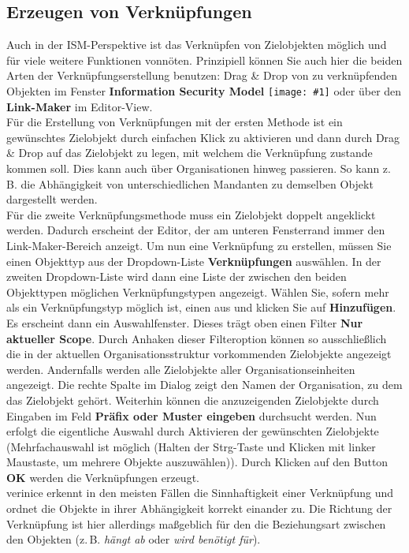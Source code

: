 \documentclass[a4paper,10pt]{book}
\newcommand{\icon}[1]{\texttt{[image: \#1]}}
\begin{document}
\subsection{Erzeugen von Verknüpfungen}
\label{sec:ismView_dd}
Auch in der ISM-Perspektive ist das Verknüpfen von Zielobjekten
möglich und für viele weitere Funktionen vonnöten.  Prinzipiell können
Sie auch hier die beiden Arten der Verknüpfungserstellung benutzen:
Drag \& Drop von zu verknüpfenden Objekten im Fenster
\textbf{Information Security
  Model} \icon{Icon/Informationssicherheitsmodell.png}
oder über den \textbf{Link-Maker} im Editor-View.
\newline\\
Für die Erstellung von Verknüpfungen mit der ersten Methode ist ein
gewünschtes Zielobjekt durch einfachen Klick zu aktivieren und dann
durch Drag \& Drop auf das Zielobjekt zu legen, mit welchem die
Verknüpfung zustande kommen soll. Dies kann auch über Organisationen
hinweg passieren.  So kann z.\,B. die Abhängigkeit von
unterschiedlichen Mandanten zu demselben Objekt dargestellt werden.
\newline\\
Für die zweite Verknüpfungsmethode muss ein Zielobjekt doppelt
angeklickt werden.  Dadurch erscheint der Editor, der am unteren
Fensterrand immer den Link-Maker-Bereich anzeigt.  Um nun eine
Verknüpfung zu erstellen, müssen Sie einen Objekttyp aus der
Dropdown-Liste \textbf{Verknüpfungen} auswählen.  In der zweiten
Dropdown-Liste wird dann eine Liste der zwischen den beiden
Objekttypen möglichen Verknüpfungstypen angezeigt.  Wählen Sie, sofern
mehr als ein Verknüpfungstyp möglich ist, einen aus und klicken Sie
auf \textbf{Hinzufügen}.  Es erscheint dann ein Auswahlfenster.
Dieses trägt oben einen Filter \textbf{Nur aktueller Scope}.  Durch
Anhaken dieser Filteroption können so ausschließlich die in der
aktuellen Organisationsstruktur vorkommenden Zielobjekte angezeigt
werden.  Andernfalls werden alle Zielobjekte aller
Organisationseinheiten angezeigt.  Die rechte Spalte im Dialog zeigt
den Namen der Organisation, zu dem das Zielobjekt gehört.  Weiterhin
können die anzuzeigenden Zielobjekte durch Eingaben im Feld
\textbf{Präfix oder Muster eingeben} durchsucht werden.  Nun erfolgt
die eigentliche Auswahl durch Aktivieren der gewünschten Zielobjekte
(Mehrfachauswahl ist möglich (Halten der Strg-Taste und Klicken mit
linker Maustaste, um mehrere Objekte auszuwählen)).  Durch Klicken auf
den Button \textbf{OK} werden die Verknüpfungen erzeugt.
\newline\\
verinice erkennt in den meisten Fällen die Sinnhaftigkeit einer
Verknüpfung und ordnet die Objekte in ihrer Abhängigkeit korrekt
einander zu.  Die Richtung der Verknüpfung ist hier allerdings
maßgeblich für den die Beziehungsart zwischen den Objekten
(z.\,B. {\em hängt ab} oder {\em wird benötigt für}).
\end{document}
